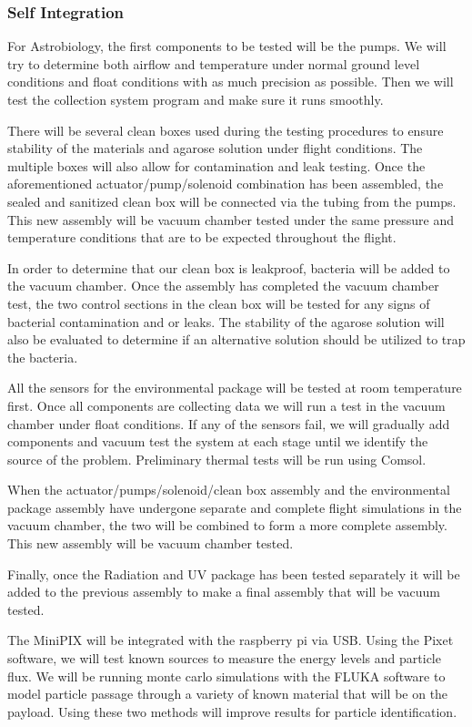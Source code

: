 \subsubsection{Self Integration}
For Astrobiology, the first components to be tested will be the pumps. We will try to determine both airflow and temperature under normal ground level conditions and float conditions with as much precision as possible. Then we will test the collection system program and make sure it runs smoothly.  

There will be several clean boxes used during the testing procedures to ensure stability of the materials and agarose solution under flight conditions. The multiple boxes will also allow for contamination and leak testing. Once the aforementioned actuator/pump/solenoid combination has been assembled, the sealed and sanitized clean box will be connected via the tubing from the pumps. This new assembly will be vacuum chamber tested under the same pressure and temperature conditions that are to be expected throughout the flight. 

In order to determine that our clean box is leakproof, bacteria will be added to the vacuum chamber. Once the assembly has completed the vacuum chamber test, the two control sections in the clean box will be tested for any signs of bacterial contamination and or leaks. The stability of the agarose solution will also be evaluated to determine if an alternative solution should be utilized to trap the bacteria. 

All the sensors for the environmental package will be tested at room temperature first. Once all components are collecting data we will run a test in the vacuum chamber under float conditions. If any of the sensors fail, we will gradually add components and vacuum test the system at each stage until we identify the source of the problem. Preliminary thermal tests will be run using Comsol. 

When the actuator/pumps/solenoid/clean box assembly and the environmental package assembly have undergone separate and complete flight simulations in the vacuum chamber, the two will be combined to form a more complete assembly. This new assembly will be vacuum chamber tested. 

Finally, once the Radiation and UV package has been tested separately it will be added to the previous assembly to make a final assembly that will be vacuum tested.  

The MiniPIX will be integrated with the raspberry pi via USB. Using the Pixet software, we will test known sources to measure the energy levels and particle flux. We will be running monte carlo simulations with the FLUKA software to model particle passage through a variety of known material that will be on the payload. Using these two methods will improve results for particle identification.

